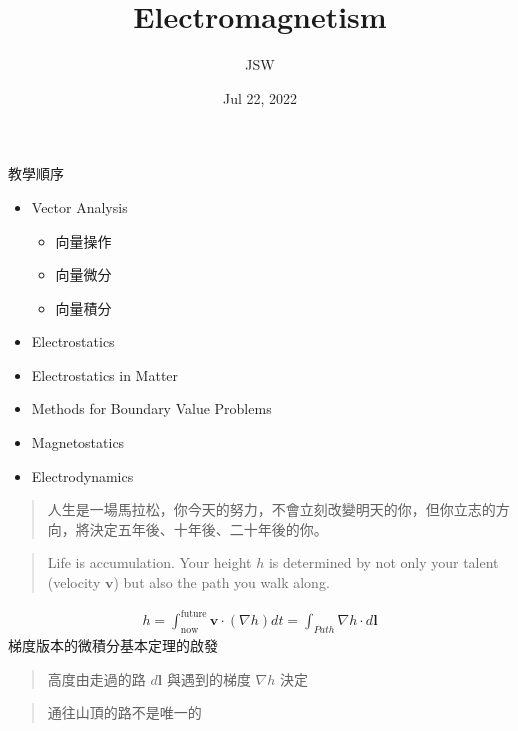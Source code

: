 \documentclass[letterpaper,10pt,english]{jupyterBook}
\title{Electromagnetism}
\date{Jul 22, 2022}
\author{JSW}
\begin{document}
\pagestyle{empty}
\sphinxmaketitle
\pagestyle{plain}
\sphinxtableofcontents
\pagestyle{normal}
\label{\detokenize{intro::doc}}


\sphinxAtStartPar
教學順序
\begin{itemize}
\item {} 
\sphinxAtStartPar
Vector Analysis
\begin{itemize}
\item {} 
\sphinxAtStartPar
向量操作

\item {} 
\sphinxAtStartPar
向量微分

\item {} 
\sphinxAtStartPar
向量積分

\end{itemize}

\item {} 
\sphinxAtStartPar
Electrostatics

\item {} 
\sphinxAtStartPar
Electrostatics in Matter

\item {} 
\sphinxAtStartPar
Methods for Boundary Value Problems

\item {} 
\sphinxAtStartPar
Magnetostatics

\item {} 
\sphinxAtStartPar
Electrodynamics

\end{itemize}

\begin{DUlineblock}{0em}
\item[] 
\end{DUlineblock}
\begin{quote}

\sphinxAtStartPar
人生是一場馬拉松，你今天的努力，不會立刻改變明天的你，但你立志的方向，將決定五年後、十年後、二十年後的你。
\end{quote}
\begin{quote}

\sphinxAtStartPar
Life is accumulation. Your height \(h\) is determined by not only your talent (velocity \(\mathbf{v}\)) but also the path you walk along.
\end{quote}
\begin{equation*}
\begin{split}h = \int_{\mathrm{now}}^{\mathrm{future}} \mathbf{v}\cdot (\nabla h) dt = \int_{Path}\nabla h \cdot d\mathbf{l} \end{split}
\end{equation*}
\sphinxAtStartPar
梯度版本的微積分基本定理的啟發
\begin{quote}

\sphinxAtStartPar
高度由走過的路 \(d\mathbf{l}\) 與遇到的梯度 \(\nabla h\) 決定
\end{quote}
\begin{quote}

\sphinxAtStartPar
通往山頂的路不是唯一的
\end{quote}
\end{document}
